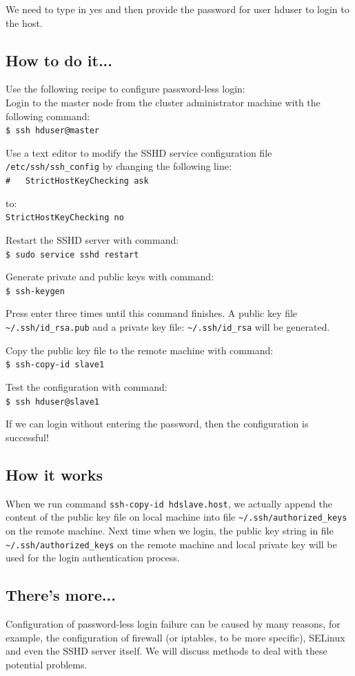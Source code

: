 We need to type in yes and then provide the password for user hduser to login to the host.
\subsection*{How to do it...}
Use the following recipe to configure password-less login: \\
Login to the master node from the cluster administrator machine with the following command: \\
\verb|$ ssh hduser@master|

Use a text editor to modify the SSHD service configuration file \verb|/etc/ssh/ssh_config| by changing the following line: \\
\verb|#   StrictHostKeyChecking ask|

to: \\
\verb|StrictHostKeyChecking no|

Restart the SSHD server with command: \\
\verb|$ sudo service sshd restart|

Generate private and public keys with command: \\
\verb|$ ssh-keygen|

Press enter three times until this command finishes. A public key file \verb|~/.ssh/id_rsa.pub| and a private key file: \verb|~/.ssh/id_rsa| will be generated.

Copy the public key file to the remote machine with command: \\
\verb|$ ssh-copy-id slave1|

Test the configuration with command: \\
\verb|$ ssh hduser@slave1|

If we can login without entering the password, then the configuration is successful!
\subsection*{How it works}
When we run command \verb|ssh-copy-id hdslave.host|, we actually append the content of the public key file on local machine into file \verb|~/.ssh/authorized_keys| on the remote machine. Next time when we login, the public key string in file \verb|~/.ssh/authorized_keys| on the remote machine and local private key will be used for the login authentication process.
\subsection*{There's more...}
Configuration of password-less login failure can be caused by many reasons, for example, the configuration of firewall (or iptables, to be more specific), SELinux and even the SSHD server itself. We will discuss methods to deal with these potential problems.

